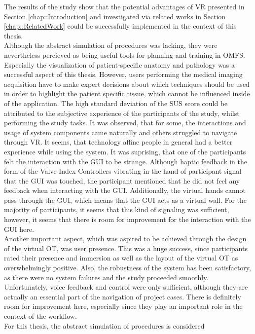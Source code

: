 The results of the study show that the potential advantages of VR 
presented in Section \ref{chap::Introduction} 
and investigated via related works in Section \ref{chap::RelatedWork}
could be successfully implemented in the context of this thesis. 
\\ Although the abstract simulation of 
procedures was lacking, they were nevertheless percieved as being 
useful tools for planning and training in OMFS.
Especially the visualization of patient-specific 
anatomy and pathology was a successful aspect of this thesis.
However, users performing the medical imaging acquisition have to make expert 
decisions about which techniques should be used in order to highlight the 
patient specific tissue, which cannot be influenced inside of the application.
The high standard deviation of the SUS score could be attributed
to the subjective experience of the participants of the study,
whilst performing the study tasks. It was observed, 
that for some, the interactions and usage of system components 
came naturally and others struggled to navigate through VR.
It seems, that technology affine people in general had a better
experience while using the system. 
It was suprising, that one of the participants felt the interaction with
the GUI to be strange. Although haptic feedback in the form of 
the Valve Index Controllers vibrating in the hand of participant 
signal that the GUI was touched, the participant mentioned that
he did not feel any feedback when interacting with the GUI.
Additionally, the virtual hands cannot pass through the GUI, which
means that the GUI acts as a virtual wall. For the majority of
participants, it seems that this kind of signaling was sufficient, 
however, it seems that there is room for improvement for the
interaction with the GUI here.
\\ Another important aspect, which was aspired to be achieved through
the design of the virtual OT, was user presence. 
This was a huge success, since participants rated their presence and 
immersion as well as the layout of the virtual OT as overwhelmingly positive. 
Also, the robustness of the system has been satisfactory, as
there were no system failures and the study proceeded smoothly.
\\ Unfortunately, voice feedback and control were only sufficient, 
although they are actually an essential part of the navigation of 
project cases. There is definitely room for improvement here, 
especially since they play an important role in the context of the workflow.
\\ For this thesis, the abstract simulation of procedures is considered
